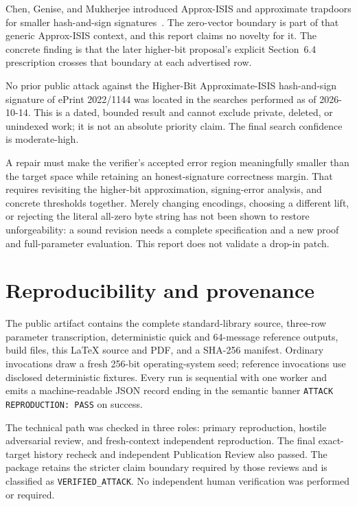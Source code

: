 \documentclass[10pt,a4paper]{article}
\begin{document}
Chen, Genise, and Mukherjee introduced Approx-ISIS and approximate trapdoors
for smaller hash-and-sign signatures~\cite{cgm}. The zero-vector boundary is
part of that generic Approx-ISIS context, and this report claims no novelty
for it. The concrete finding is that the later higher-bit proposal's explicit
Section~6.4 prescription crosses that boundary at each advertised row.

No prior public attack against the Higher-Bit Approximate-ISIS hash-and-sign
signature of ePrint 2022/1144 was located in the searches performed as of
2026-10-14. This is a dated, bounded result and cannot exclude private,
deleted, or unindexed work; it is not an absolute priority claim. The final
search confidence is moderate-high.

A repair must make the verifier's accepted error region meaningfully smaller
than the target space while retaining an honest-signature correctness margin.
That requires revisiting the higher-bit approximation, signing-error analysis,
and concrete thresholds together. Merely changing encodings, choosing a
different lift, or rejecting the literal all-zero byte string has not been
shown to restore unforgeability: a sound revision needs a complete
specification and a new proof and full-parameter evaluation. This report does
not validate a drop-in patch.

\section{Reproducibility and provenance}

The public artifact contains the complete standard-library source,
three-row parameter transcription, deterministic quick and 64-message
reference outputs, build files, this \LaTeX{} source and PDF, and a SHA-256
manifest. Ordinary invocations draw a fresh 256-bit operating-system seed;
reference invocations use disclosed deterministic fixtures. Every run is
sequential with one worker and emits a machine-readable JSON record ending in
the semantic banner \texttt{ATTACK REPRODUCTION: PASS} on success.

The technical path was checked in three roles: primary reproduction, hostile
adversarial review, and fresh-context independent reproduction. The final
exact-target history recheck and independent Publication Review also passed.
The package retains the stricter claim boundary required by those reviews and
is classified as \texttt{VERIFIED\_ATTACK}. No independent human verification
was performed or required.
\end{document}
